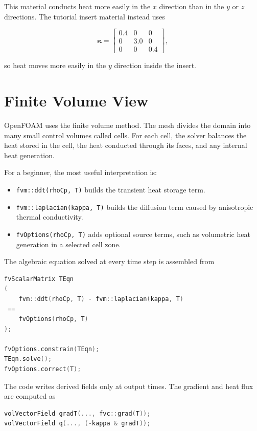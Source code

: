 \documentclass[11pt,a4paper]{article}
\newcommand{\code}[1]{\texttt{#1}}
\newcommand{\kappatensor}{\boldsymbol{\kappa}}
\begin{document}
This material conducts heat more easily in the $x$ direction than in the $y$ or
$z$ directions. The tutorial insert material instead uses

\[
\kappatensor =
\begin{bmatrix}
0.4 & 0 & 0 \\
0 & 3.0 & 0 \\
0 & 0 & 0.4
\end{bmatrix},
\]

so heat moves more easily in the $y$ direction inside the insert.

\section{Finite Volume View}

OpenFOAM uses the finite volume method. The mesh divides the domain into many
small control volumes called cells. For each cell, the solver balances the heat
stored in the cell, the heat conducted through its faces, and any internal heat
generation.

For a beginner, the most useful interpretation is:

\begin{itemize}
    \item \code{fvm::ddt(rhoCp, T)} builds the transient heat storage term.
    \item \code{fvm::laplacian(kappa, T)} builds the diffusion term caused by
    anisotropic thermal conductivity.
    \item \code{fvOptions(rhoCp, T)} adds optional source terms, such as
    volumetric heat generation in a selected cell zone.
\end{itemize}

The algebraic equation solved at every time step is assembled from

\begin{lstlisting}[language=C++]
fvScalarMatrix TEqn
(
    fvm::ddt(rhoCp, T) - fvm::laplacian(kappa, T)
 ==
    fvOptions(rhoCp, T)
);

fvOptions.constrain(TEqn);
TEqn.solve();
fvOptions.correct(T);
\end{lstlisting}

The code writes derived fields only at output times. The gradient and heat flux
are computed as

\begin{lstlisting}[language=C++]
volVectorField gradT(..., fvc::grad(T));
volVectorField q(..., (-kappa & gradT));
\end{lstlisting}
\end{document}
